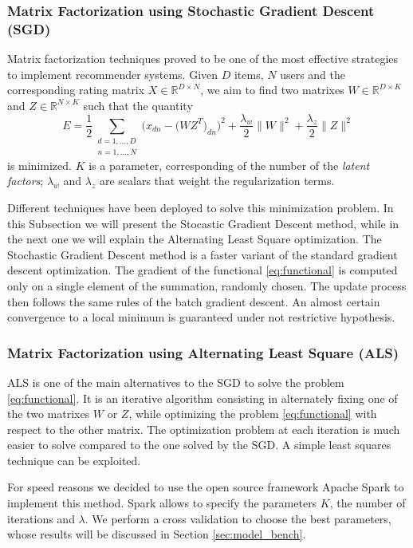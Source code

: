 \documentclass[10pt,conference,compsocconf]{IEEEtran}
\begin{document}
\subsubsection{Matrix Factorization using Stochastic Gradient Descent (SGD)}
Matrix factorization techniques proved to be one of the most effective strategies to implement 
recommender systems. Given $D$ items, $N$ users and the corresponding rating matrix 
$X \in \mathbb{R}^{D \times N}$, we aim to find two matrixes $W \in \mathbb{R}^{D \times K}$ and $Z
\in \mathbb{R}^{N \times K}$ such that the quantity 
\begin{equation}
\label{eq:functional}
E = \frac{1}{2} \sum_{\substack{d=1,...,D \\n=1,...,N}} 
\bigg( x_{dn} - \big( WZ^T \big)_{dn} \bigg) ^2 +\frac{\lambda_w}{2}\|W\|^2 + 
\frac{\lambda_z}{2}\|Z\|^2
\end{equation} 
is minimized. $K$ is a parameter,
corresponding of the number of the \textit{latent factors}; $\lambda_w$ and $\lambda_z$ are scalars
that weight the regularization terms.

Different techniques have been deployed to solve this minimization problem. In this Subsection we
will present the Stocastic Gradient Descent method, while in the next one we will explain the
Alternating Least Square optimization. 
The Stochastic Gradient Descent method is a faster variant of the standard gradient descent
optimization. The gradient of the functional \ref{eq:functional} is computed only on a single
element of the summation, randomly chosen. The update process then follows the same rules of the batch
gradient descent.
An almost certain convergence to a local minimum is guaranteed under not restrictive hypothesis.


\subsubsection{Matrix Factorization using Alternating Least Square (ALS)}
ALS is one of the main alternatives to the SGD to solve the problem \ref{eq:functional}.
It is an iterative algorithm consisting in alternately fixing one of the two matrixes $W$ or $Z$,
while optimizing the problem \ref{eq:functional} with respect to the other matrix.
The optimization problem at each iteration is much easier to solve compared to the one solved by the
SGD. A simple least squares technique can be exploited.

For speed reasons we decided to use the open source framework Apache Spark to implement this method.
Spark allows to specify the parameters $K$, the number of iterations and $\lambda$. We perform a
cross validation to choose the best parameters, whose results will be discussed in Section 
\ref{sec:model_bench}.
\end{document}
